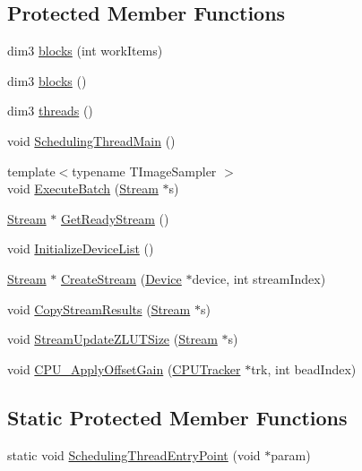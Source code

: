 \subsection*{Protected Member Functions}
\begin{DoxyCompactItemize}
\item 
dim3 \hyperlink{class_queued_c_u_d_a_tracker_a4ad02fd62376586e7026f723447d5d61}{blocks} (int work\+Items)
\item 
dim3 \hyperlink{class_queued_c_u_d_a_tracker_a935e85ca846ef768ffeca1ff4a23ab21}{blocks} ()
\item 
dim3 \hyperlink{class_queued_c_u_d_a_tracker_ae88c5554dba8227967f4a600ff7fab84}{threads} ()
\item 
void \hyperlink{class_queued_c_u_d_a_tracker_ac52125061a2b042a6c149156977b8474}{Scheduling\+Thread\+Main} ()
\item 
{\footnotesize template$<$typename T\+Image\+Sampler $>$ }\\void \hyperlink{class_queued_c_u_d_a_tracker_a66c822d85cceb3b20793a9f5be76aae0}{Execute\+Batch} (\hyperlink{struct_queued_c_u_d_a_tracker_1_1_stream}{Stream} $\ast$s)
\item 
\hyperlink{struct_queued_c_u_d_a_tracker_1_1_stream}{Stream} $\ast$ \hyperlink{class_queued_c_u_d_a_tracker_a31ec528bdf605169edb8bb27c5e6bbfc}{Get\+Ready\+Stream} ()
\item 
void \hyperlink{class_queued_c_u_d_a_tracker_ae7806b9e8d79fb4add720019ed4e72ed}{Initialize\+Device\+List} ()
\item 
\hyperlink{struct_queued_c_u_d_a_tracker_1_1_stream}{Stream} $\ast$ \hyperlink{class_queued_c_u_d_a_tracker_a6d4cd925c04dbf04b1eaad291f6218d2}{Create\+Stream} (\hyperlink{struct_queued_c_u_d_a_tracker_1_1_device}{Device} $\ast$device, int stream\+Index)
\item 
void \hyperlink{class_queued_c_u_d_a_tracker_a03544a8c3c5bf7b55dd55393532c5b0d}{Copy\+Stream\+Results} (\hyperlink{struct_queued_c_u_d_a_tracker_1_1_stream}{Stream} $\ast$s)
\item 
void \hyperlink{class_queued_c_u_d_a_tracker_ab1feeeb058f9652ef11053958f01062f}{Stream\+Update\+Z\+L\+U\+T\+Size} (\hyperlink{struct_queued_c_u_d_a_tracker_1_1_stream}{Stream} $\ast$s)
\item 
void \hyperlink{class_queued_c_u_d_a_tracker_a7c53f54a55fde1ad9181d907f10de1d2}{C\+P\+U\+\_\+\+Apply\+Offset\+Gain} (\hyperlink{class_c_p_u_tracker}{C\+P\+U\+Tracker} $\ast$trk, int bead\+Index)
\end{DoxyCompactItemize}
\subsection*{Static Protected Member Functions}
\begin{DoxyCompactItemize}
\item 
static void \hyperlink{class_queued_c_u_d_a_tracker_a16da3da0346279b6a2dd4276eb15a25b}{Scheduling\+Thread\+Entry\+Point} (void $\ast$param)
\end{DoxyCompactItemize}
